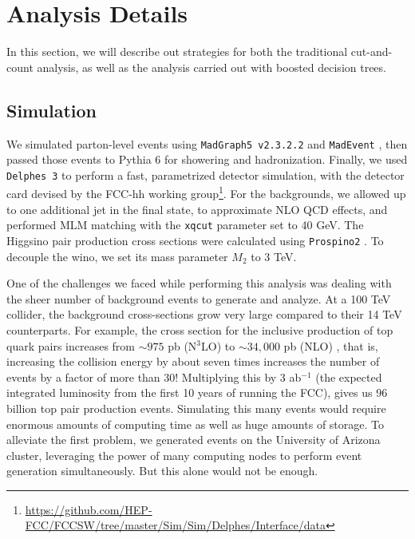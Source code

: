 \section{Analysis Details}\label{sec:analysis}

In this section, we will describe out strategies for both the traditional cut-and-count analysis, as well as the analysis carried out with boosted decision trees. 

\subsection{Simulation}\label{simulation}

We simulated parton-level events using \texttt{MadGraph5 v2.3.2.2} and \texttt{MadEvent} \citep{Alwall2014}, then passed those events to Pythia 6 \citep{Sjostrand2006} for showering and hadronization. Finally, we used \texttt{Delphes 3} \citep{DeFavereau2014a} to perform a fast, parametrized detector simulation, with the detector card devised by the FCC-hh working group\footnote{\url{https://github.com/HEP-FCC/FCCSW/tree/master/Sim/Sim/Delphes/Interface/data}}. For the backgrounds, we allowed up to one additional jet in the final state, to approximate NLO QCD effects, and performed MLM matching with the \texttt{xqcut} parameter set to 40 GeV. The Higgsino pair production cross sections were calculated using \texttt{Prospino2} \citep{Beenakker1999}. To decouple the wino, we set its mass parameter $M_2$ to 3 TeV.

One of the challenges we faced while performing this analysis was dealing with the sheer number of background events to generate and analyze. At a 100 TeV collider, the background cross-sections grow very large compared to their 14 TeV counterparts. For example, the cross section for the inclusive production of top quark pairs increases from $\sim975$ pb (N$^{3}$LO) to $\sim34,000$ pb (NLO) \citep{Mangano:2016jyj}, that is, increasing the collision energy by about seven times increases the number of events by a factor of more than 30! Multiplying this by 3 ab$^{-1}$ (the expected integrated luminosity from the first 10 years of running the FCC), gives us 96 billion top pair production events. Simulating this many events would require enormous amounts of computing time as well as huge amounts of storage. To alleviate the first problem, we generated events on the University of Arizona cluster, leveraging the power of many computing nodes to perform event generation simultaneously. But this alone would not be enough. 

